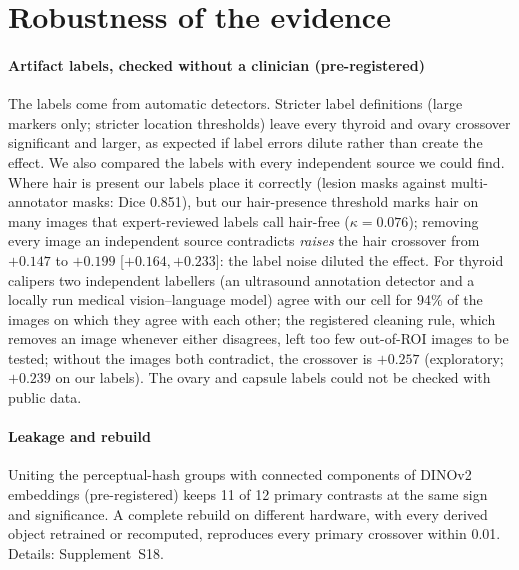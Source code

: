 \section{Robustness of the evidence}\label{sec:robustness}\label{sec:labels}\label{sec:leak_emb}\label{sec:repro}
\paragraph{Artifact labels, checked without a clinician (pre-registered)} The labels come from automatic detectors.
Stricter label definitions (large markers only; stricter location thresholds) leave every thyroid and ovary crossover
significant and larger, as expected if label errors dilute rather than create the effect. We also compared the labels
with every independent source we could find. Where hair is present our labels place it correctly (lesion masks against
multi-annotator masks: Dice 0.851), but our hair-presence threshold marks hair on many images that
expert-reviewed labels call hair-free ($\kappa=0.076$); removing every image an independent source contradicts
\emph{raises} the hair crossover from $+0.147$ to $+0.199$ [$+0.164, +0.233$]: the label noise diluted the effect. For thyroid calipers two independent
labellers (an ultrasound annotation detector and a locally run medical vision--language model) agree with our cell for
94\% of the images on which they agree with each other; the registered cleaning rule, which removes an image whenever
either disagrees, left too few out-of-ROI images to be tested; without the images both contradict, the crossover is
$+0.257$ (exploratory; $+0.239$ on our labels). The ovary and capsule labels could not be checked with public data.

\paragraph{Leakage and rebuild} Uniting the perceptual-hash groups with connected components of DINOv2 embeddings
(pre-registered) keeps 11 of 12 primary contrasts at the same sign and significance. A complete rebuild on different
hardware, with every derived object retrained or recomputed, reproduces every primary crossover within 0.01. Details:
Supplement~S18.
